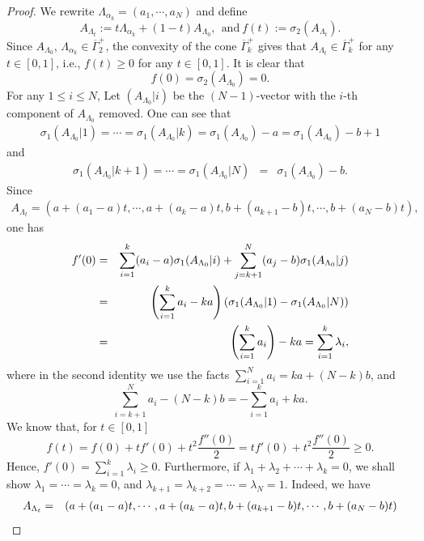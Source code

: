 \documentclass[12pt]{amsart}
\theoremstyle{plain}
\theoremstyle{definition}
\renewcommand{\bar}{\overline}
\renewcommand{\>}{\rightarrow}
\numberwithin{equation}{section} %
\begin{document}
\begin{proof}
		We rewrite $\Lambda_{\alpha_k}=(a_1,\cdots,a_N)$ and define $$	A_{\Lambda_t}:=t\Lambda_{\alpha_k}+(1-t)A_{\Lambda_0},\ \  \text{and}\  f(t):=\sigma_2(A_{\Lambda_t}).$$  Since $A_{\Lambda_0}$, $\Lambda_{\alpha_k}\in\bar{\Gamma}_2^+$, the convexity of the cone $\bar{\Gamma}_k^+$ gives that $A_{\Lambda_t}\in\bar{\Gamma}_k^+$ for any $t\in[0,1]$, i.e., $f(t)\geq0$ for any $t\in[0,1]$. 
		It is clear that
		\begin{equation}\label{eq4.2}
		f(0)=\sigma_2(A_{\Lambda_0})=0.
		\end{equation}
		For any $1\leq i\leq N$, Let $(A_{\Lambda_0}|i)$ be the $(N-1)$-vector with the $i$-th component of $A_{\Lambda_0}$ removed. One can see that
		\begin{eqnarray}\label{eq4.03}
		\sigma_1(A_{\Lambda_0}|1)=\cdots=\sigma_1(A_{\Lambda_0}|k)=\sigma_1(A_{\Lambda_0})-a=\sigma_1(A_{\Lambda_0})-b+1
		\end{eqnarray}
		and 
		\begin{eqnarray}\label{eq4.003}
		\sigma_1(A_{\Lambda_0}|k+1)=\cdots=\sigma_1(A_{\Lambda_0}|N)
		&=&\sigma_1(A_{\Lambda_0})-b.
		\end{eqnarray}
		Since 
		\begin{eqnarray*}
			A_{\Lambda_t}=(a+(a_1-a)t,\cdots,a+(a_k-a)t,b+(a_{k+1}-b)t,\cdots,b+(a_N-b)t),
		\end{eqnarray*} one has 
		\begin{eqnarray}\label{eq4.4}
		f'(0)&=&\sum_{i=1}^{k}(a_i-a)\sigma_1(A_{\Lambda_0}|i)+\sum_{j=k+1}^N(a_j-b)\sigma_1(A_{\Lambda_0}|j)\notag\\
		&=&\left(\sum_{i=1}^{k}a_i-ka\right)(\sigma_1(A_{\Lambda_0}|1)-\sigma_1(A_{\Lambda_0}|N))\notag\\
		&=&\left(\sum_{i=1}^{k}a_i\right)-ka=\sum_{i=1}^k \lambda_i,
		\end{eqnarray}
		where in the second identity we use the facts
		$\sum\limits_{i=1}^Na_i=ka+(N-k)b$,
		and
		\begin{equation}\label{eq4.3}
		\sum_{i=k+1}^{N}a_i-(N-k)b=-\sum_{i=1}^{k}a_i+ka.
		\end{equation}
		We know that, for $t\in[0,1]$
		$$f(t)=f(0)+tf'(0)+t^2\frac{f''(0)}{2}=tf'(0)+t^2\frac{f''(0)}{2}\geq 0.$$
		Hence, $f'(0)=\sum\limits_{i=1}^k \lambda_i\geq 0$.
		Furthermore, if  $\lambda_{1}+\lambda_{2}+\cdots+\lambda_{k}=0$,  we shall show $\lambda_{1}=\cdots =\lambda_{k}=0$, and $\lambda_{k+1}=\lambda_{k+2}=\cdots=\lambda_{N}=1$. Indeed, we have 
		\begin{eqnarray*}
			A_{\Lambda_t}&=&(a+(a_1-a)t,\cdots,a+(a_k-a)t,b+(a_{k+1}-b)t,\cdots,b+(a_N-b)t)\notag\\

\end{eqnarray*}
\end{proof}
\end{document}
